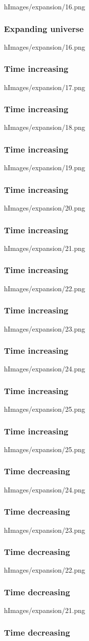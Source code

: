 \begin{frameb}{h}{Images/expansion/16.png} \frametitle{Expanding universe} \end{frameb}
\begin{frameb}{h}{Images/expansion/16.png} \frametitle{Time increasing} \end{frameb}
\begin{frameb}{h}{Images/expansion/17.png} \frametitle{Time increasing} \end{frameb}
\begin{frameb}{h}{Images/expansion/18.png} \frametitle{Time increasing} \end{frameb}
\begin{frameb}{h}{Images/expansion/19.png} \frametitle{Time increasing} \end{frameb}
\begin{frameb}{h}{Images/expansion/20.png} \frametitle{Time increasing} \end{frameb}
\begin{frameb}{h}{Images/expansion/21.png} \frametitle{Time increasing} \end{frameb}
\begin{frameb}{h}{Images/expansion/22.png} \frametitle{Time increasing} \end{frameb}
\begin{frameb}{h}{Images/expansion/23.png} \frametitle{Time increasing} \end{frameb}
\begin{frameb}{h}{Images/expansion/24.png} \frametitle{Time increasing} \end{frameb}
\begin{frameb}{h}{Images/expansion/25.png} \frametitle{Time increasing} \end{frameb}
\begin{frameb}{h}{Images/expansion/25.png} \frametitle{Time decreasing} \end{frameb}
\begin{frameb}{h}{Images/expansion/24.png} \frametitle{Time decreasing} \end{frameb}
\begin{frameb}{h}{Images/expansion/23.png} \frametitle{Time decreasing} \end{frameb}
\begin{frameb}{h}{Images/expansion/22.png} \frametitle{Time decreasing} \end{frameb}
\begin{frameb}{h}{Images/expansion/21.png} \frametitle{Time decreasing} \end{frameb}
